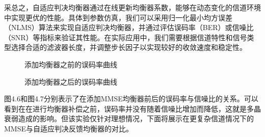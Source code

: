 \documentclass[UTF8,a4paper,12pt]{ctexart}
\numberwithin{equation}{section}
\begin{document}
采总之，自适应判决均衡器通过在线更新均衡器系数，能够在动态变化的信道环境中实现更优的性能。具体到参数仿真，我们可以采用归一化最小均方误差（NLMS）算法来实现自适应判决均衡器，并通过评估误码率（BER）或信噪比（SNR）等指标来验证其性能。在实际应用中，我们需要根据信道特性和信号类型选择合适的滤波器长度，并调整步长因子以实现较好的收敛速度和稳定性。
\begin{figure}[htb] 
	\caption{添加均衡器之前的误码率曲线}
\end{figure}
\begin{figure}[htb] 
	\caption{添加均衡器之后的误码率曲线}
\end{figure}
图4.6和图4.7分别表示了在添加MMSE均衡器前后的误码率与信噪比的关系。可以看到在在进行均衡器补偿之前，误码率并没有随着信噪比增加而降低，这就是多晶衰弱造成的影响。但该实验仅针对理想情况，下面将展示在更复杂信道情况下的MMSE与自适应判决反馈均衡器的对比。
\end{document}
